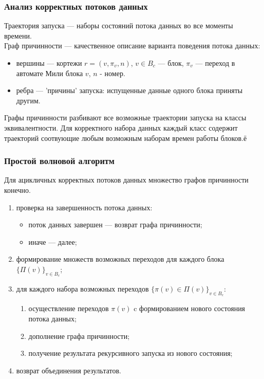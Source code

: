 \documentclass[10pt,pdf,hyperref={unicode}]{beamer}
\begin{document}
\begin{frame}
  \frametitle{Анализ корректных потоков данных}
  Траектория запуска --- наборы состояний потока данных во все моменты времени. \\
  Граф причинности --- качественное описание варианта поведения потока данных:
  \begin{itemize}
    \item вершины --- кортежи $r = (v, \pi_v, n)$, $v \in B_c$ --- блок, $\pi_v$ --- переход в автомате Мили блока $v$, $n$ - номер.
    \item ребра --- 'причины' запуска: испущенные данные одного блока приняты другим.
  \end{itemize}
  Графы причинности разбивают все возможные траектории запуска на классы эквивалентности.
  Для корректного набора данных каждый класс содержит траекторий соотвующие любым возможным наборам времен работы блоков.ё
\end{frame}

\begin{frame}
  \frametitle{Простой волновой алгоритм}
  Для ацикличных корректных потоков данных множество графов причинности конечно.
  \begin{enumerate}
    \item проверка на завершенность потока данных:
      \begin{itemize}
        \item поток данных завершен --- возврат графа причинности;
        \item иначе --- далее;
      \end{itemize}
    \item формирование множеств возможных переходов для каждого блока $\{\Pi(v)\}_{v \in B_c}$;
    \item для каждого набора возможных переходов $\{\pi(v) \in \Pi(v)\}_{v \in B_c}$:
    \begin{enumerate}
      \item осуществление переходов $\pi(v)$ c формированием нового состояния потока данных;
      \item дополнение графа причинности;
      \item получение результата рекурсивного запуска из нового состояния;
    \end{enumerate}
    \item возврат объединения результатов.
  \end{enumerate}
\end{frame}
\end{document}
